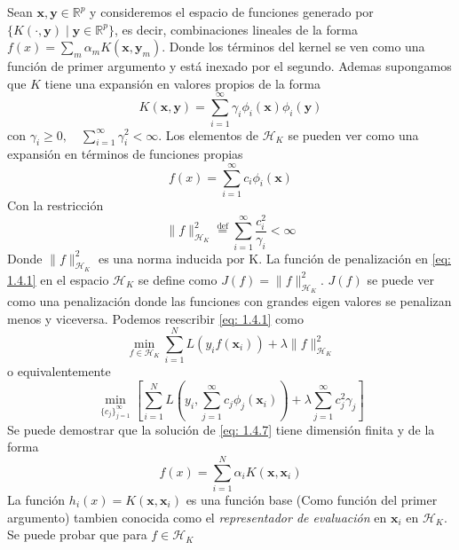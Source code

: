\documentclass[letterpaper,12pt,oneside]{book}
\begin{document}
{{      
Sean $\mathbf{x},\mathbf{y} \in \mathbb{R}^p$ y consideremos el espacio de funciones generado por \(\{K(\cdot, \mathbf{y}) \mid \mathbf{y} \in \mathbb{R}^p\}\), es decir, combinaciones lineales de la forma $f(x) = \sum_m \alpha_m K(\mathbf{x}, \mathbf{y}_m)$.
      Donde los términos del kernel se ven como una función de primer argumento y está inexado por el segundo. 
      Ademas supongamos que $K$ tiene una expansión en valores propios de la forma
      \begin{equation}
          K(\mathbf{x}, \mathbf{y}) = \sum_{i=1}^{\infty} \gamma_i \phi_i(\mathbf{x}) \phi_i(\mathbf{y})
      \end{equation}
    con $\gamma_i \geq 0, \quad \sum_{i=1}^{\infty} \gamma_i^2 < \infty.$ Los elementos de $\mathcal{H}_K$ se pueden ver como una expansión en términos de funciones propias
    \begin{equation}
        f(x) = \sum_{i=1}^{\infty} c_i \phi_i(\mathbf{x})
    \end{equation}
    Con la restricción 
    \begin{equation}
        \|f\|_{\mathcal{H}_K}^2 \overset{\text{def}}{=} \sum_{i=1}^{\infty} \frac{c_i^2}{\gamma_i}  < \infty
    \end{equation}
    Donde $\|f\|_{\mathcal{H}_K}^2$ es una norma inducida por K. La función de penalización en \eqref{eq: 1.4.1} en el espacio $\mathcal{H}_K$ se define como  $J(f)=\|f\|_{\mathcal{H}_K}^2$. $J(f)$ se puede ver como una penalización donde las funciones con grandes eigen valores se penalizan menos y viceversa. Podemos reescribir \eqref{eq: 1.4.1} como 
    \begin{equation}
        \min_{f \in \mathcal{H}_K} \sum_{i=1}^{N} L(y_i f(\mathbf{x}_i)) + \lambda \|f\|^2_{\mathcal{H}_K} \label{eq: 1.4.7}
    \end{equation}
    o equivalentemente 
     \begin{equation}
        \min_{\{c_j\}_{j=1}^{\infty}} \left[ \sum_{i=1}^{N} L\left( y_i, \sum_{j=1}^{\infty} c_j \phi_j(\mathbf{x}_i) \right) + \lambda \sum_{j=1}^{\infty} c_j^2 \gamma_j \right] \label{eq: 1.5.1}
    \end{equation}
    Se puede demostrar que la solución de \eqref{eq: 1.4.7} tiene dimensión finita y de la forma 
    \begin{equation}
        f(x) = \sum_{i=1}^{N} \alpha_i K(\mathbf{x}, \mathbf{x}_i)
    \end{equation}
    La función $h_i(x) = K(\mathbf{x}, \mathbf{x}_i)$ es una función base (Como función del primer argumento) tambien conocida como el \textit{representador de evaluación} en $\mathbf{x}_i$ en $\mathcal{H}_K$. Se puede probar que para $f \in \mathcal{H}_K$
}}
\end{document}
